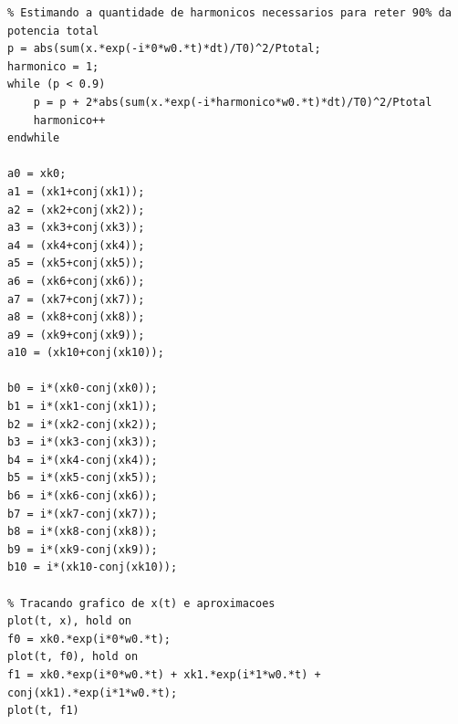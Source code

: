\documentclass{article}
\begin{document}
\begin{verbatim}
% Estimando a quantidade de harmonicos necessarios para reter 90% da potencia total
p = abs(sum(x.*exp(-i*0*w0.*t)*dt)/T0)^2/Ptotal;
harmonico = 1;
while (p < 0.9)
    p = p + 2*abs(sum(x.*exp(-i*harmonico*w0.*t)*dt)/T0)^2/Ptotal
    harmonico++
endwhile

a0 = xk0;
a1 = (xk1+conj(xk1));
a2 = (xk2+conj(xk2));
a3 = (xk3+conj(xk3));
a4 = (xk4+conj(xk4));
a5 = (xk5+conj(xk5));
a6 = (xk6+conj(xk6));
a7 = (xk7+conj(xk7));
a8 = (xk8+conj(xk8));
a9 = (xk9+conj(xk9));
a10 = (xk10+conj(xk10));

b0 = i*(xk0-conj(xk0));
b1 = i*(xk1-conj(xk1));
b2 = i*(xk2-conj(xk2));
b3 = i*(xk3-conj(xk3));
b4 = i*(xk4-conj(xk4));
b5 = i*(xk5-conj(xk5));
b6 = i*(xk6-conj(xk6));
b7 = i*(xk7-conj(xk7));
b8 = i*(xk8-conj(xk8));
b9 = i*(xk9-conj(xk9));
b10 = i*(xk10-conj(xk10));

% Tracando grafico de x(t) e aproximacoes
plot(t, x), hold on
f0 = xk0.*exp(i*0*w0.*t);
plot(t, f0), hold on
f1 = xk0.*exp(i*0*w0.*t) + xk1.*exp(i*1*w0.*t) + conj(xk1).*exp(i*1*w0.*t);
plot(t, f1)
\end{verbatim}
\end{document}
